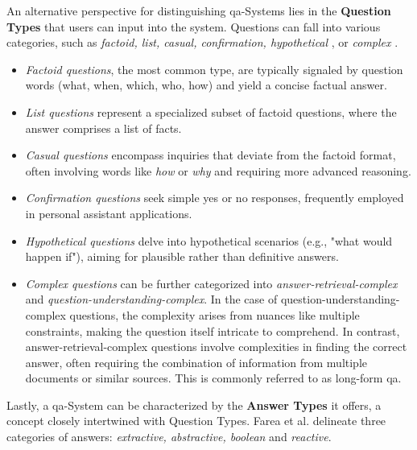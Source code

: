 An alternative perspective for distinguishing \gls{qa}-Systems lies in the \textbf{Question Types} that users can input into the system. Questions can fall into various categories, such as \textit{factoid, list, casual, confirmation, hypothetical} \cite{mishra_survey_2016}, or \textit{complex} \cite{etezadi_state_2023}.

\begin{itemize}
   \item \textit{Factoid questions}, the most common type, are typically signaled by question words (what, when, which, who, how) and yield a concise factual answer.
   
   \item \textit{List questions} represent a specialized subset of factoid questions, where the answer comprises a list of facts.
   
   \item \textit{Casual questions} encompass inquiries that deviate from the factoid format, often involving words like \textit{how} or \textit{why} and requiring more advanced reasoning.
   
   \item \textit{Confirmation questions} seek simple yes or no responses, frequently employed in personal assistant applications.
   
   \item \textit{Hypothetical questions} delve into hypothetical scenarios (e.g., "what would happen if"), aiming for plausible rather than definitive answers.
   
   \item \textit{Complex questions} can be further categorized into \textit{answer-retrieval-complex} and \textit{question-understanding-complex}. In the case of question-understanding-complex questions, the complexity arises from nuances like multiple constraints, making the question itself intricate to comprehend. In contrast, answer-retrieval-complex questions involve complexities in finding the correct answer, often requiring the combination of information from multiple documents or similar sources. This is commonly referred to as long-form \gls{qa}.
\end{itemize}

Lastly, a \gls{qa}-System can be characterized by the \textbf{Answer Types} it offers, a concept closely intertwined with Question Types. Farea et al. \cite{farea_evaluation_2022} delineate three categories of answers: \textit{extractive, abstractive, boolean} and \textit{reactive}. 

